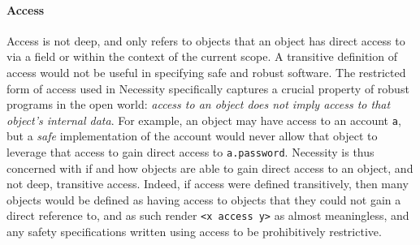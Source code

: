 \documentclass[11pt]{amsart}
\newcommand{\prg}[1]{\texttt{#1}}
\begin{document}
%
%
%
%


\paragraph{\textbf{Access}}  Access is not deep, and only refers to objects that an object has direct access to via a field or within the context of the current scope. 
A transitive definition of access would not be useful in specifying safe and robust software. The restricted form of access used in Necessity
specifically captures a crucial property of robust programs in the open world: \emph{access to an object does not imply access to that object's internal data}.
For example, an object may have access to an account \texttt{a}, but a \emph{safe} implementation of the account
would never allow that object to leverage that access to gain direct access to \texttt{a.password}.
Necessity is thus concerned with if and how objects are able to gain direct access to an object, and not deep, transitive access.
Indeed, if access were defined transitively, then many objects would be defined as having access to objects that they could not gain a direct reference to, 
and as such render \texttt{<x access y>} as almost meaningless, and any safety specifications written using access to be prohibitively restrictive.
\end{document}
